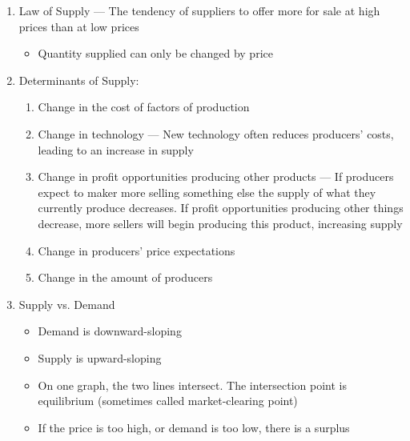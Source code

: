 \documentclass[12pt]{article}
\begin{document}
\begin{enumerate}
\begin{multicols}{2}
    \end{multicols}

  \item Law of Supply — The tendency of suppliers to offer more for sale at high prices than at low prices

    \begin{itemize}

      \item Quantity supplied can only be changed by price

    \end{itemize}

  \item Determinants of Supply:

    \begin{enumerate}

      \item Change in the cost of factors of production

      \item Change in technology — New technology often reduces producers' costs, leading to an increase in supply

      \item Change in profit opportunities producing other products — If producers expect to maker more selling something else the supply of what they currently produce decreases. If profit opportunities producing other things decrease, more sellers will begin producing this product, increasing supply

      \item Change in producers' price expectations

      \item Change in the amount of producers

    \end{enumerate}

  \item Supply vs. Demand

    \begin{itemize}

      \item Demand is downward-sloping

      \item Supply is upward-sloping

      \item On one graph, the two lines intersect. The intersection point is equilibrium (sometimes called market-clearing point)

      \item If the price is too high, or demand is too low, there is a surplus


\end{itemize}
\end{enumerate}
\end{document}
